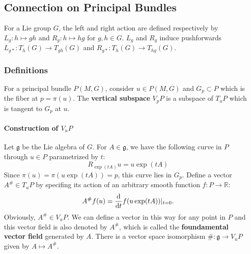 \documentclass[10pt]{article}
\begin{document}
\subsection{Connection on Principal Bundles}
For a Lie group $G$, the left and right action are defined respectively by $L_g:h\mapsto gh$ and $R_g:h\mapsto hg$ for $g,h\in G$.
$L_g$ and $R_g$ induce pushforwards $L_{g\ast}:T_h(G)\to T_{gh}(G)$ and $R_{g\ast}:T_h(G)\to T_{hg}(G)$.
\subsubsection{Definitions}

\begin{definition}
    For a principal bundle $P(M,G)$, consider $u\in P(M,G)$ and $G_p\subset P$ which is the fiber at $p=\pi(u)$.
    The \textbf{vertical subspace} $V_p P$ is a subspace of $T_u P$ which is tangent to $G_p$ at $u$.
\end{definition}
\paragraph{Construction of $V_u P$}
Let $\mathfrak{g}$ be the Lie algebra of $G$.
For $A\in\mathfrak{g}$, we have the following curve in $P$ through $u\in P$ parametrized by $t$:
\begin{equation}
    R_{\exp(tA)}u=u\exp(tA)
\end{equation}
Since $\pi(u)=\pi(u\exp(tA))=p$, this curve lies in $G_p$.
Define a vector $A^\#\in T_u P$ by specifing its action of an arbitrary smooth function $f:P\to\mathbb{R}$:
\begin{equation}
    A^\# f(u)=\dv{t}f(u\exp(tA))\vert_{t=0}.
\end{equation}
Obviously, $A^\#\in V_u P$.
We can define a vector in this way for any point in $P$ and this vector field is also denoted by $A^\#$, which is called the \textbf{foundamental vector field} generated by $A$.
There is a vector space isomorphism $\#:\mathfrak{g}\to V_u P$ given by $A\mapsto A^\#$.
\end{document}

